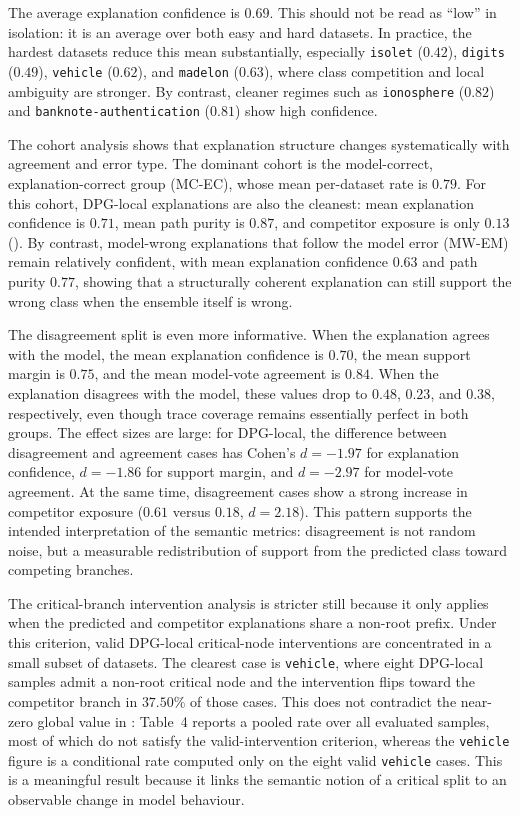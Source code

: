 \documentclass[runningheads]{llncs}
\begin{document}
The average explanation confidence is $0.69$. This should not be read as
``low'' in isolation: it is an average over both easy and hard datasets. In
practice, the hardest datasets reduce this mean substantially, especially
\texttt{isolet} ($0.42$), \texttt{digits} ($0.49$), \texttt{vehicle}
($0.62$), and \texttt{madelon} ($0.63$), where class competition and local ambiguity are stronger. By contrast, cleaner regimes such as
\texttt{ionosphere} ($0.82$) and \texttt{banknote-authentication} ($0.81$) show high confidence.

The cohort analysis shows that explanation structure changes systematically with agreement and error type. The dominant cohort is the model-correct, explanation-correct group (MC-EC), whose mean per-dataset rate is $0.79$. For this cohort, DPG-local explanations are also the cleanest: mean explanation confidence is $0.71$, mean path purity is $0.87$, and competitor exposure is only $0.13$ (). By contrast, model-wrong explanations that follow the model error (MW-EM) remain relatively confident, with mean explanation confidence $0.63$ and path purity $0.77$, showing that a structurally coherent explanation can still support the wrong class when the ensemble itself is wrong.

The disagreement split is even more informative. When the explanation agrees with the model, the mean explanation confidence is $0.70$, the mean support margin is $0.75$, and the mean model-vote agreement is $0.84$. When the explanation disagrees with the model, these values drop to $0.48$, $0.23$, and $0.38$, respectively, even though trace coverage remains essentially perfect in both groups. The effect sizes are large: for DPG-local, the difference between disagreement and agreement cases has Cohen's $d=-1.97$ for explanation confidence, $d=-1.86$ for support margin, and $d=-2.97$ for model-vote agreement. At the same time, disagreement cases show a strong increase in competitor exposure ($0.61$ versus $0.18$, $d=2.18$).
This pattern supports the intended interpretation of the semantic metrics: disagreement is not random noise, but a measurable redistribution of support from the predicted class toward competing branches.

The critical-branch intervention analysis is stricter still because it only
applies when the predicted and competitor explanations share a non-root prefix.
Under this criterion, valid DPG-local critical-node interventions are
concentrated in a small subset of datasets. The clearest case is
\texttt{vehicle}, where eight DPG-local samples admit a non-root critical
node and the intervention flips toward the competitor branch in $37.50\%$ of
those cases. This does not contradict the near-zero global value in
: Table~4 reports a pooled rate over all
evaluated samples, most of which do not satisfy the valid-intervention
criterion, whereas the \texttt{vehicle} figure is a conditional rate computed
only on the eight valid \texttt{vehicle} cases. This is a meaningful result because it links the semantic notion
of a critical split to an observable change in model behaviour.
\end{document}
